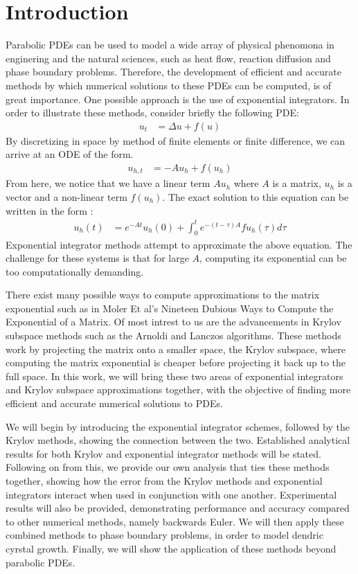 \section{Introduction}

Parabolic PDEs can be used to model a wide array of physical phenomona in enginering and the natural sciences, such as heat flow, reaction diffusion and phase boundary problems.
Therefore, the development of efficient and accurate methods by which numerical solutions to these PDEs can be computed, is of great importance.
One possible approach is the use of exponential integrators.
In order to illustrate these methods, consider briefly the following PDE:
\begin{align*}
    u_t &= \Delta u + f(u)
\end{align*}
By discretizing in space by method of finite elements or finite difference, we can arrive at an ODE of the form.
\begin{align*}
    u_{h,t} &= -Au_h + f(u_h)
\end{align*}
From here, we notice that we have a linear term $Au_h$ where $A$ is a matrix, $u_h$ is a vector and a non-linear term $f(u_h)$.
The exact solution to this equation can be written in the form \cite{Hochbruck2010}:
\begin{align*}
    u_h(t) &= e^{-At}u_{h}(0) + \int^t_0 e^{-(t-\tau)A}fu_{h}(\tau)d\tau
\end{align*}
Exponential integrator methods attempt to approximate the above equation.
The challenge for these systems is that for large $A$, computing its exponential can be too computationally demanding.

There exist many possible ways to compute approximations to the matrix exponential such as in Moler Et al's Nineteen Dubious Ways to Compute the Exponential of a Matrix\cite{Moler2003}.
Of most intrest to us are the advancements in Krylov subspace methods such as the Arnoldi and Lanczos algorithms.
These methods work by projecting the matrix onto a smaller space, the Krylov subspace, where computing the matrix exponential is cheaper before projecting it back up to the full space.
In this work, we will bring these two areas of exponential integrators and Krylov subspace approximations together, with the objective of finding more efficient and accurate numerical solutions to PDEs.

We will begin by introducing the exponential integrator schemes, followed by the Krylov methods, showing the connection between the two.
Established analytical results for both Krylov and exponential integrator methods will be stated.
Following on from this, we provide our own analysis that ties these methods together, showing how the error from the Krylov methods and exponential integrators interact when used in conjunction with one another.
Experimental results will also be provided, demonstrating performance and accuracy compared to other numerical methods, namely backwards Euler.
We will then apply these combined methods to phase boundary problems, in order to model dendric cyrstal growth.
Finally, we will show the application of these methods beyond parabolic PDEs.